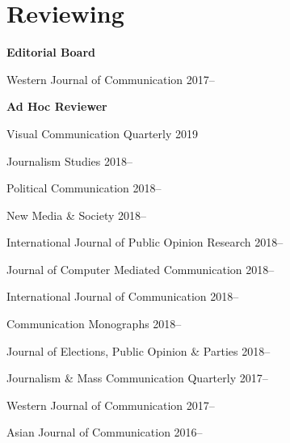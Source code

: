 \section{Reviewing}

  \textbf{Editorial Board}
    \begin{innerlist}
      \item Western Journal of Communication                         \hfill 2017--
    \end{innerlist}\vspace{1em}

  \textbf{Ad Hoc Reviewer}
    \begin{innerlist}
      \item Visual Communication Quarterly                           \hfill 2019
      \item Journalism Studies                                       \hfill 2018--
      \item Political Communication                                  \hfill 2018--
      \item New Media \& Society                                     \hfill 2018--
      \item International Journal of Public Opinion Research         \hfill 2018--
      \item Journal of Computer Mediated Communication               \hfill 2018--
      \item International Journal of Communication                   \hfill 2018--
      \item Communication Monographs                                 \hfill 2018--
      \item Journal of Elections, Public Opinion \& Parties          \hfill 2018--
      \item Journalism \& Mass Communication Quarterly               \hfill 2017--
      \item Western Journal of Communication                         \hfill 2017--
      \item Asian Journal of Communication                           \hfill 2016--
    \end{innerlist}\vspace{-.075in}
